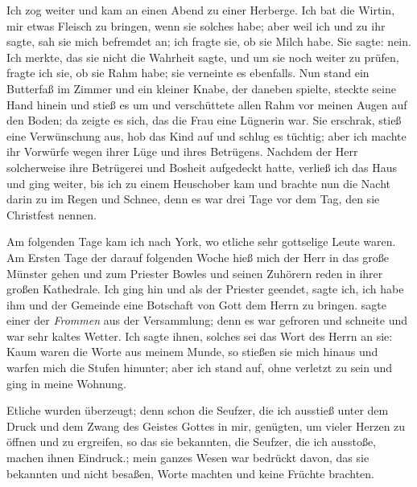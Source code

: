 Ich zog weiter und kam an einen Abend zu einer Herberge.
Ich bat die Wirtin, mir etwas Fleisch zu bringen, wenn sie solches
habe; aber weil ich  und  zu ihr 
sagte, sah sie mich 
befremdet an; ich fragte sie, ob sie Milch habe. Sie sagte: nein.
Ich merkte, das sie nicht die Wahrheit sagte, und um sie noch
weiter zu prüfen, fragte ich sie, ob sie Rahm habe; sie verneinte es
ebenfalls. Nun stand ein Butterfaß im Zimmer und ein kleiner
Knabe, der daneben spielte, steckte seine Hand hinein und stieß es
um und verschüttete allen Rahm vor meinen Augen auf den
Boden; da zeigte es sich, das die Frau eine Lügnerin war. Sie
erschrak, stieß eine Verwünschung aus, hob das Kind auf und
schlug es tüchtig; aber ich machte ihr Vorwürfe wegen ihrer
Lüge und ihres Betrügens. Nachdem der Herr solcherweise ihre
Betrügerei und Bosheit aufgedeckt hatte, verließ ich das Haus
und ging weiter, bis ich zu einem Heuschober kam und brachte
nun die Nacht darin zu im Regen und Schnee, denn es war
drei Tage vor dem Tag, den sie Christfest nennen.

Am folgenden Tage kam ich nach York, wo etliche sehr 
gottselige Leute waren. Am Ersten Tage der darauf folgenden
Woche hieß mich der Herr in das große Münster gehen und zum
Priester Bowles und seinen Zuhörern 
reden in ihrer großen
Kathedrale. Ich ging hin und als der Priester geendet, sagte ich,
ich habe ihm und der Gemeinde eine Botschaft von Gott dem
Herrn zu bringen.  sagte einer der
\textit{Frommen} aus der Versammlung; denn es war gefroren und
schneite und war sehr kaltes Wetter. Ich sagte ihnen, solches
sei das Wort des Herrn an sie:  Kaum waren
die Worte aus meinem Munde, so stießen sie mich hinaus und
warfen mich die Stufen hinunter; aber ich stand auf, ohne verletzt
zu sein und ging in meine Wohnung. 

Etliche wurden überzeugt;
denn schon die Seufzer, die ich ausstieß unter dem Druck und
dem Zwang des Geistes Gottes in mir, genügten, um vieler
Herzen zu öffnen und zu ergreifen, so das sie bekannten, die Seufzer,
die ich ausstoße, machen ihnen Eindruck.; mein ganzes Wesen
war bedrückt davon, das sie bekannten und nicht besaßen, Worte
machten und keine Früchte brachten.

